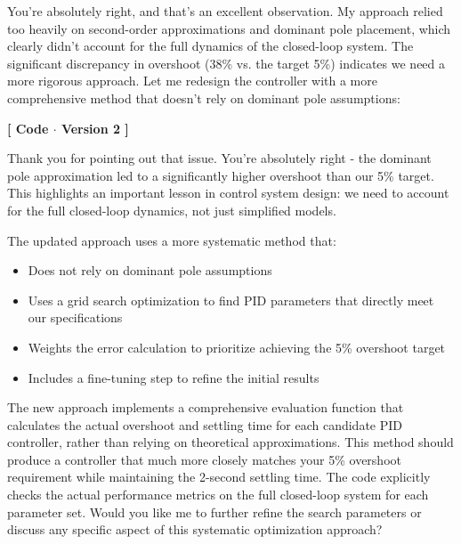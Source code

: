 \documentclass{article}
\begin{document}
\begin{claude}
You're absolutely right, and that's an excellent observation. My approach relied too heavily on second-order approximations and dominant pole placement, which clearly didn't account for the full dynamics of the closed-loop system. The significant discrepancy in overshoot (38\% vs. the target 5\%) indicates we need a more rigorous approach.
Let me redesign the controller with a more comprehensive method that doesn't rely on dominant pole assumptions:

\textbf{[ Code $\cdot$ Version 2 ]}

Thank you for pointing out that issue. You're absolutely right - the dominant pole approximation led to a significantly higher overshoot than our 5\% target. This highlights an important lesson in control system design: we need to account for the full closed-loop dynamics, not just simplified models.

The updated approach uses a more systematic method that:
\begin{itemize}
  \item Does not rely on dominant pole assumptions
  \item Uses a grid search optimization to find PID parameters that directly meet our specifications
  \item Weights the error calculation to prioritize achieving the 5\% overshoot target
  \item Includes a fine-tuning step to refine the initial results
\end{itemize}

The new approach implements a comprehensive evaluation function that calculates the actual overshoot and settling time for each candidate PID controller, rather than relying on theoretical approximations.
This method should produce a controller that much more closely matches your 5\% overshoot requirement while maintaining the 2-second settling time. The code explicitly checks the actual performance metrics on the full closed-loop system for each parameter set.
Would you like me to further refine the search parameters or discuss any specific aspect of this systematic optimization approach?
\end{claude}
\end{document}
